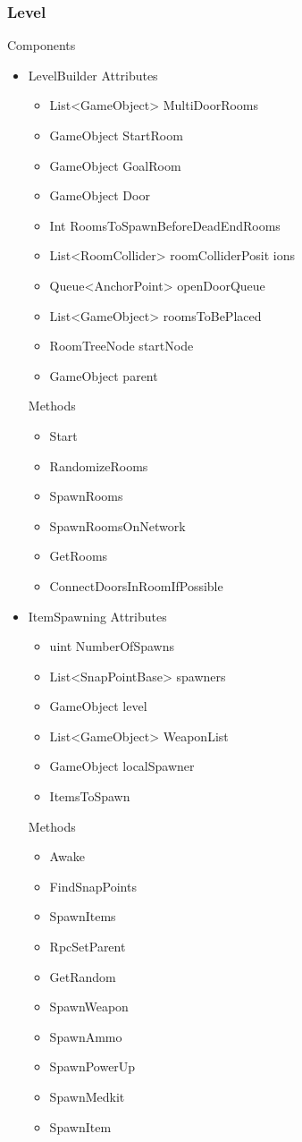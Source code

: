 \documentclass[11pt]{article}
\begin{document}
\subsubsection{Level}
Components
\begin{itemize}
	\item LevelBuilder
	\newline Attributes
	\begin{itemize}
		\item List<GameObject> MultiDoorRooms
		\item GameObject StartRoom
		\item GameObject GoalRoom
		\item GameObject Door
		\item Int RoomsToSpawnBeforeDeadEndRooms
		\item List<RoomCollider> roomColliderPosit	ions
		\item Queue<AnchorPoint> openDoorQueue
		\item List<GameObject> roomsToBePlaced
		\item RoomTreeNode startNode
		\item GameObject parent
	\end{itemize}
	Methods
	\begin{itemize}
		\item Start
		\item RandomizeRooms
		\item SpawnRooms
		\item SpawnRoomsOnNetwork
		\item GetRooms
		\item ConnectDoorsInRoomIfPossible
	\end{itemize}
\newpage
	\item ItemSpawning
	\newline Attributes
	\begin{itemize}
		\item uint NumberOfSpawns
		\item List<SnapPointBase> spawners
		\item GameObject level
		\item List<GameObject> WeaponList
		\item GameObject localSpawner
		\item ItemsToSpawn
	\end{itemize}
	Methods
	\begin{itemize}
		\item Awake
		\item FindSnapPoints
		\item SpawnItems
		\item RpcSetParent
		\item GetRandom
		\item SpawnWeapon
		\item SpawnAmmo
		\item SpawnPowerUp
		\item SpawnMedkit
		\item SpawnItem
	\end{itemize}
\end{itemize}
\end{document}
